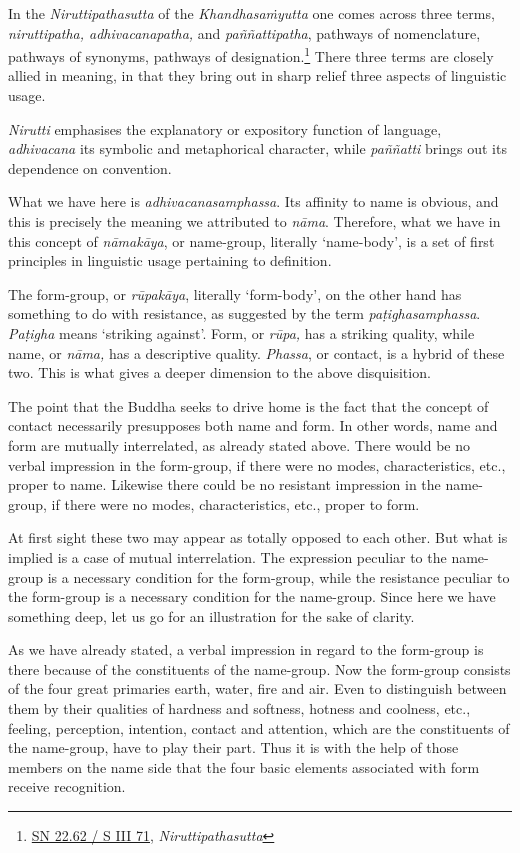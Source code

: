 In the \emph{Niruttipathasutta} of the \emph{Khandhasaṁyutta} one comes across three terms, \emph{niruttipatha, adhivacanapatha,} and \emph{paññattipatha}, pathways of nomenclature, pathways of synonyms, pathways of designation.\footnote{\href{https://suttacentral.net/sn22.62/pli/ms}{SN 22.62 / S III 71}, \emph{Niruttipathasutta}} There three terms are closely allied in meaning, in that they bring out in sharp relief three aspects of linguistic usage.

\emph{Nirutti} emphasises the explanatory or expository function of language, \emph{adhivacana} its symbolic and metaphorical character, while \emph{paññatti} brings out its dependence on convention.

What we have here is \emph{adhivacanasamphassa}. Its affinity to name is obvious, and this is precisely the meaning we attributed to \emph{nāma}. Therefore, what we have in this concept of \emph{nāmakāya}, or name-group, literally `name-body', is a set of first principles in linguistic usage pertaining to definition.

The form-group, or \emph{rūpakāya}, literally `form-body', on the other hand has something to do with resistance, as suggested by the term \emph{paṭighasamphassa}. \emph{Paṭigha} means `striking against'. Form, or \emph{rūpa,} has a striking quality, while name, or \emph{nāma,} has a descriptive quality. \emph{Phassa}, or contact, is a hybrid of these two. This is what gives a deeper dimension to the above disquisition.

The point that the Buddha seeks to drive home is the fact that the concept of contact necessarily presupposes both name and form. In other words, name and form are mutually interrelated, as already stated above. There would be no verbal impression in the form-group, if there were no modes, characteristics, etc., proper to name. Likewise there could be no resistant impression in the name-group, if there were no modes, characteristics, etc., proper to form.

At first sight these two may appear as totally opposed to each other. But what is implied is a case of mutual interrelation. The expression peculiar to the name-group is a necessary condition for the form-group, while the resistance peculiar to the form-group is a necessary condition for the name-group. Since here we have something deep, let us go for an illustration for the sake of clarity.

As we have already stated, a verbal impression in regard to the form-group is there because of the constituents of the name-group. Now the form-group consists of the four great primaries earth, water, fire and air. Even to distinguish between them by their qualities of hardness and softness, hotness and coolness, etc., feeling, perception, intention, contact and attention, which are the constituents of the name-group, have to play their part. Thus it is with the help of those members on the name side that the four basic elements associated with form receive recognition.

